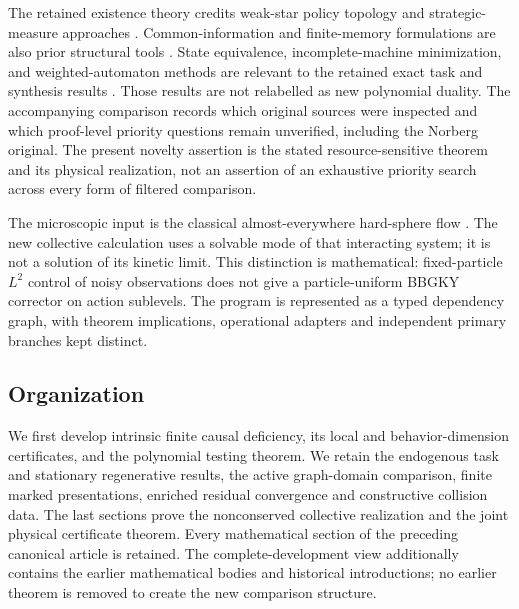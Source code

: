 The retained existence theory credits weak-star policy topology and
strategic-measure approaches \cite{Saldi2017Topology,YukselSaldi2017}.
Common-information and finite-memory formulations are also prior
structural tools \cite{Witsenhausen1979,NayyarMahajanTeneketzis2013}.
State equivalence, incomplete-machine minimization, and weighted-automaton
methods are relevant to the retained exact task and synthesis results
\cite{Nerode1958,PaullUnger1959,Kiefer2020}. Those results are not
relabelled as new polynomial duality. The accompanying comparison
records which original sources were inspected and which proof-level
priority questions remain unverified, including the Norberg original.
The present novelty assertion is the stated resource-sensitive theorem
and its physical realization, not an assertion of an exhaustive
priority search across every form of filtered comparison.

The microscopic input is the classical almost-everywhere hard-sphere
flow \cite{GallagherSaintRaymondTexier}. The new collective calculation
uses a solvable mode of that interacting system; it is not a solution
of its kinetic limit. This distinction is mathematical: fixed-particle
$L^2$ control of noisy observations does not give a particle-uniform
BBGKY corrector on action sublevels. The program is represented as a
typed dependency graph, with theorem implications, operational adapters
and independent primary branches kept distinct.

\subsection{Organization}
We first develop intrinsic finite causal deficiency, its local and
behavior-dimension certificates, and the polynomial testing theorem.
We retain the endogenous task and stationary regenerative results, the
active graph-domain comparison, finite marked presentations, enriched
residual convergence and constructive collision data. The last sections
prove the nonconserved collective realization and the joint physical
certificate theorem. Every mathematical section of the preceding
canonical article is retained. The complete-development view additionally
contains the earlier mathematical bodies and historical introductions;
no earlier theorem is removed to create the new comparison structure.
